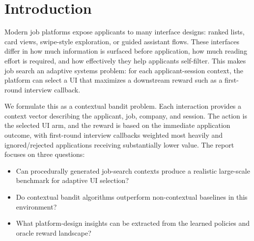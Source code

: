 \documentclass[10pt,twocolumn]{article}
\begin{document}
\setcounter{page}{1}

\section{Introduction}
Modern job platforms expose applicants to many interface designs: ranked lists, card views, swipe-style exploration, or guided assistant flows. These interfaces differ in how much information is surfaced before application, how much reading effort is required, and how effectively they help applicants self-filter. This makes job search an adaptive systems problem: for each applicant-session context, the platform can select a UI that maximizes a downstream reward such as a first-round interview callback.

We formulate this as a contextual bandit problem. Each interaction provides a context vector describing the applicant, job, company, and session. The action is the selected UI arm, and the reward is based on the immediate application outcome, with first-round interview callbacks weighted most heavily and ignored/rejected applications receiving substantially lower value. The report focuses on three questions:
\begin{itemize}
    \item Can procedurally generated job-search contexts produce a realistic large-scale benchmark for adaptive UI selection?
    \item Do contextual bandit algorithms outperform non-contextual baselines in this environment?
    \item What platform-design insights can be extracted from the learned policies and oracle reward landscape?
\end{itemize}
\end{document}
